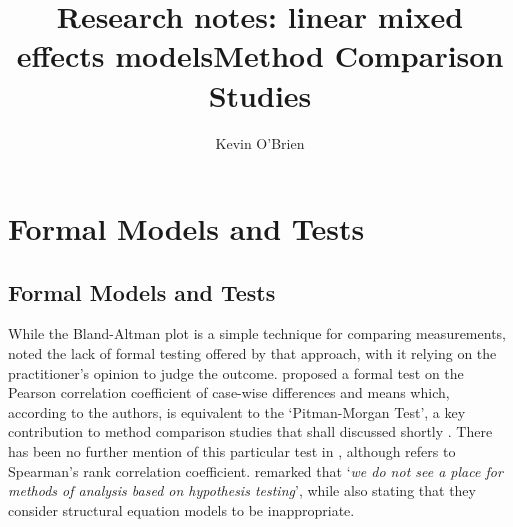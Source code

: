 \documentclass[12pt, a4paper]{report}
\title{Research notes: linear mixed effects models}
\author{ } \date{ }
\theoremstyle{plain}
\theoremstyle{definition}
\theoremstyle{remark}
\begin{document}
	\author{Kevin O'Brien}
	\title{Method Comparison Studies}
	
	
	\tableofcontents
	
	
	
	
\chapter{Formal Models and Tests}


\section{Formal Models and Tests}
While the Bland-Altman plot is a simple technique for comparing measurements, \citet{Kinsella} noted the lack of formal testing offered by
that approach, with it relying on the practitioner's opinion to judge the outcome. \citet{BA83} proposed a formal test on the
Pearson correlation coefficient of case-wise differences and means which, according to the authors, is equivalent
to the `Pitman-Morgan Test', a key contribution to method comparison studies that shall discussed shortly \citep{morgan, pitman}. There has been no further mention of this particular test in
\citet{BA86}, although \citet{BA99} refers to Spearman's rank
correlation coefficient. \citet{BA99} remarked that `\textit{we do not see a
place for methods of analysis based on hypothesis testing}', while also stating that they consider structural equation models to be inappropriate.
\end{document}
